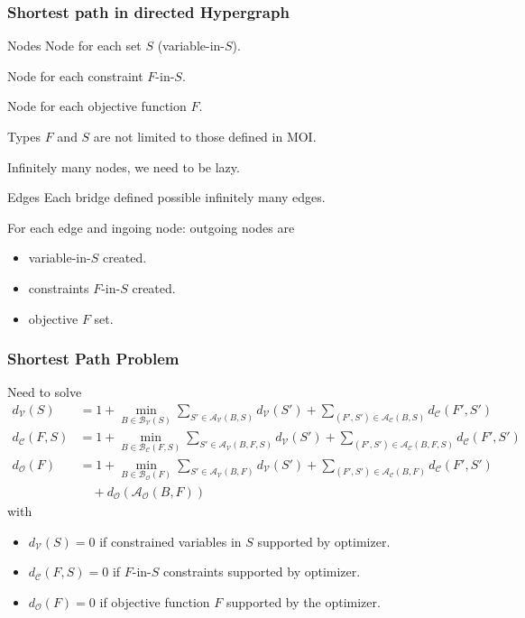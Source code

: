 \documentclass{beamer}
\begin{document}
\begin{frame}
  \frametitle{Shortest path in directed Hypergraph}
  \vspace{-.2cm}
  \begin{block}{Nodes}
    Node for each set $S$ (variable-in-$S$).

    Node for each constraint $F$-in-$S$.

    Node for each objective function $F$.

    Types $F$ and $S$ are \alert{not limited} to those defined in MOI.

    \alert{Infinitely} many nodes, we need to be \alert{lazy}.
  \end{block}
  \vspace{-.2cm}
  \begin{block}{Edges}
    Each bridge defined possible \alert{infinitely} many edges.

    For each edge and ingoing node: outgoing nodes are
    \begin{itemize}
        \item variable-in-$S$ created.
        \item constraints $F$-in-$S$ created.
        \item objective $F$ set.
    \end{itemize}
  \end{block}

\end{frame}

\begin{frame}
  \frametitle{Shortest Path Problem}
  Need to solve
  \begin{align*}
    d_\mathcal{V}(S) & =
    1 + \min_{B \in \mathcal{B}_\mathcal{V}(S)}
		\sum_{S' \in \mathcal{A_\mathcal{V}}(B, S)} d_\mathcal{V}(S') +
	  \sum_{(F', S') \in \mathcal{A_\mathcal{C}}(B, S)} d_\mathcal{C}(F', S')\\
    d_\mathcal{C}(F, S) & =
    1 + \min_{B \in \mathcal{B}_\mathcal{C}(F, S)}
		\sum_{S' \in \mathcal{A_\mathcal{V}}(B, F, S)} d_\mathcal{V}(S') +
	  \sum_{(F', S') \in \mathcal{A_\mathcal{C}}(B, F, S)} d_\mathcal{C}(F', S')\\
    d_\mathcal{O}(F) & =
    1 + \min_{B \in \mathcal{B}_\mathcal{O}(F)}
		\sum_{S' \in \mathcal{A_\mathcal{V}}(B, F)} d_\mathcal{V}(S') +
	  \sum_{(F', S') \in \mathcal{A_\mathcal{C}}(B, F)} d_\mathcal{C}(F', S')\\
    & \quad + d_\mathcal{O}(\mathcal{A_\mathcal{O}}(B, F))
  \end{align*}
  with
	\begin{itemize}
		\item $d_\mathcal{V}(S) = 0$ if constrained variables in $S$ supported by optimizer.
		\item $d_\mathcal{C}(F, S) = 0$ if $F$-in-$S$ constraints supported by optimizer.
		\item $d_\mathcal{O}(F) = 0$ if objective function $F$ supported by the optimizer.
	\end{itemize}
\end{frame}
\end{document}
